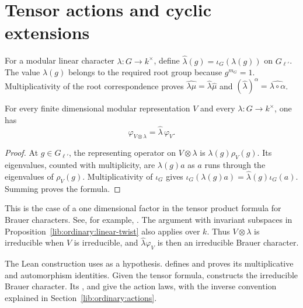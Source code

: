 \section{Tensor actions and cyclic extensions}
\label{lib:brauer:actions-extensions}

For a modular linear character $\lambda:G\to k^\times$, define
$\widehat\lambda(g)=\iota_G(\lambda(g))$ on $G_{\ell'}$.
The value $\lambda(g)$ belongs to the required root group because
$g^{m_G}=1$. Multiplicativity of the root correspondence proves
$\widehat{\lambda\mu}=\widehat\lambda\widehat\mu$ and
$(\widehat\lambda)^\alpha=\widehat{\lambda\circ\alpha}$.

\begin{theorem}
\label{lib:brauer:tensor-source}
For every finite dimensional modular representation $V$ and every
$\lambda:G\to k^\times$, one has
\[
 \varphi_{V\otimes\lambda}=\widehat\lambda\,\varphi_V.
\]
\end{theorem}
\begin{proof}
At $g\in G_{\ell'}$, the representing operator on $V\otimes\lambda$
is $\lambda(g)\rho_V(g)$. Its eigenvalues, counted with multiplicity,
are $\lambda(g)a$ as $a$ runs through the eigenvalues of $\rho_V(g)$.
Multiplicativity of $\iota_G$ gives
$\iota_G(\lambda(g)a)=\widehat\lambda(g)\iota_G(a)$.
Summing proves the formula.
\end{proof}

This is the case of a one dimensional factor in the tensor product
formula for Brauer characters. See, for example,
\cite[proof of Theorem~2.23]{Navarro1998}.
The argument with invariant subspaces in
Proposition~\ref{lib:ordinary:linear-twist} also applies over $k$.
Thus $V\otimes\lambda$ is irreducible when $V$ is irreducible, and
$\widehat\lambda\varphi_V$ is then an irreducible Brauer character.

\begin{implementation}
The Lean construction uses
 as a hypothesis.
 defines
 and proves
its multiplicative and automorphism identities. Given the tensor formula,
 constructs the
irreducible Brauer character. Its ,
 and  give the
action laws, with the inverse convention explained in
Section~\ref{lib:ordinary:actions}.
\end{implementation}

